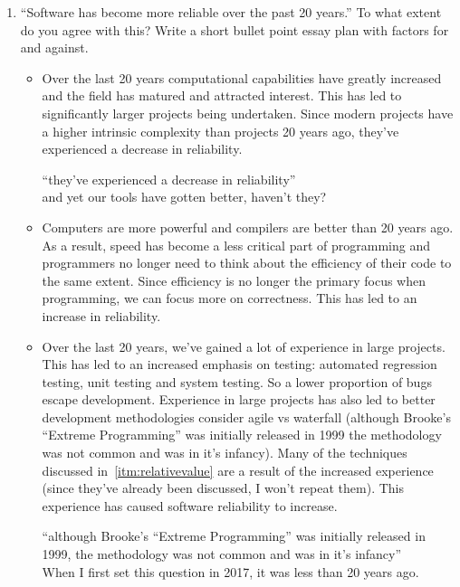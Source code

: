 \documentclass[10pt,\jkfside,a4paper]{article}
\begin{document}
\begin{enumerate}
\begin{examquestion}{2000}{9}{6}
\end{examquestion}

\item ``Software has become more reliable over the past 20 years.'' To
what extent do you agree with this? Write a short bullet point essay plan
with factors for and against.

\begin{itemize}

\item Over the last 20 years computational capabilities have greatly increased
and the field has matured and attracted interest. This has led to significantly
larger projects being undertaken. Since modern projects have a higher intrinsic
complexity than projects 20 years ago, they've experienced a decrease in
reliability.

{\color{blue}
``they've experienced a decrease in reliability''\\
and yet our tools have gotten better, haven't they?
}

\item Computers are more powerful and compilers are better than 20 years ago.
As a result, speed has become a less critical part of programming and
programmers no longer need to think about the efficiency of their code to the
same extent. Since efficiency is no longer the primary focus when programming,
we can focus more on correctness. This has led to an increase in reliability.

\item Over the last 20 years, we've gained a lot of experience in large
projects. This has led to an increased emphasis on testing: automated
regression testing, unit testing and system testing. So a lower proportion
of  bugs escape development. Experience in large projects has also
led to better development methodologies consider agile vs waterfall (although
Brooke's ``Extreme Programming'' was initially released in 1999 the methodology
was not common and was in it's infancy). Many of the techniques discussed
in~\ref{itm:relativevalue} are a result of the increased experience (since
they've already been discussed, I won't repeat them).
This experience has caused software reliability to increase.

{\color{blue}
``although Brooke's ``Extreme Programming'' was initially released in 1999, the methodology
was not common and was in it's infancy''\\
When I first set this question in 2017, it was less than 20 years ago.
}


\end{itemize}
\end{enumerate}
\end{document}
